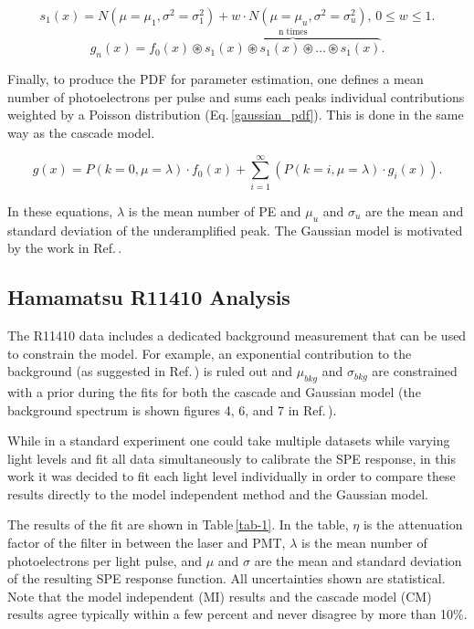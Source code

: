 \documentclass[11pt,a4paper]{article}
\newcommand\eqnref[1]{Eq.\,\ref{#1}}
\newcommand\tabref[1]{Table\,\ref{#1}}
\newcommand\citeref[1]{Ref.\,\cite{#1}}
\begin{document}
\begin{equation}
\label{gaussian_spe}
s_1(x) = N(\mu=\mu_1, \sigma^2=\sigma^2_1) + w \cdot N(\mu=\mu_u, \sigma^2=\sigma^2_u), \, 0 \leq w \leq 1.
\end{equation}
\begin{equation}
\label{gaussian_mpe}
g_n(x) = f_0(x) \circledast \overbrace{s_1(x) \circledast s_1(x) \circledast \ldots \circledast s_1(x)}^{\text{n times}}.
\end{equation}

Finally, to produce the PDF for parameter estimation, one defines a mean number of photoelectrons per pulse and sums each peaks individual contributions weighted by a Poisson distribution (\eqnref{gaussian_pdf}).  This is done in the same way as the cascade model.

\begin{equation}
\label{gaussian_pdf}
g(x) = P(k=0, \mu=\lambda) \cdot f_0(x) + \sum^{\infty}_{i=1} (P(k=i, \mu=\lambda) \cdot g_i(x)).
\end{equation}

In these equations, $\lambda$ is the mean number of PE and $\mu_u$ and $\sigma_u$ are the mean and standard deviation of the underamplified peak.  The Gaussian model is motivated by the work in \citeref{mayani}.  


\subsection{\label{sec:level3-1}Hamamatsu R11410 Analysis}

The R11410 data includes a dedicated background measurement that can be used to constrain the model.  For example, an exponential contribution to the background (as suggested in \citeref{bellamy}) is ruled out and $\mu_{bkg}$ and $\sigma_{bkg}$ are constrained with a prior during the fits for both the cascade and Gaussian model (the background spectrum is shown figures 4, 6, and 7 in \citeref{saldanha}).

While in a standard experiment one could take multiple datasets while varying light levels and fit all data simultaneously to calibrate the SPE response, in this work it was decided to fit each light level individually in order to compare these results directly to the model independent method and the Gaussian model.  

The results of the fit are shown in \tabref{tab-1}.  In the table, $\eta$ is the attenuation factor of the filter in between the laser and PMT, $\lambda$ is the mean number of photoelectrons per light pulse, and $\mu$ and $\sigma$ are the mean and standard deviation of the resulting SPE response function.  All uncertainties shown are statistical.  Note that the model independent (MI) results and the cascade model (CM) results agree typically within a few percent and never disagree by more than 10\%.
\end{document}

